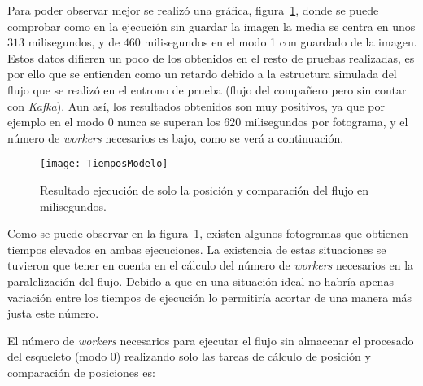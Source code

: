 {\begin{table}[h]
	\centering
	\caption{Tabla con los resultados de la ejecución solo de la posición y comparación del flujo en milisegundos.}
	\label{tab:res1}
\end{table}

Para poder observar mejor se realizó una gráfica, figura~\ref{fig:res1}, donde se puede comprobar como en la ejecución sin guardar la imagen la media se centra en unos $313$ milisegundos, y de $460$ milisegundos en el modo 1 con guardado de la imagen. Estos datos difieren un poco de los obtenidos en el resto de pruebas realizadas, es por ello que se entienden como un retardo debido a la estructura simulada del flujo que se realizó en el entrono de prueba (flujo del compañero pero sin contar con \textit{Kafka}). Aun así, los resultados obtenidos son muy positivos, ya que por ejemplo en el modo 0 nunca se superan los $620$ milisegundos por fotograma, y el número de \textit{workers} necesarios es bajo, como se verá a continuación.

\begin{figure}[h]
	\centering
	\texttt{[image: TiemposModelo]}
	\caption{Resultado ejecución de solo la posición y comparación del flujo en milisegundos.}
	\label{fig:res1}
\end{figure}

Como se puede observar en la figura~\ref{fig:res1}, existen algunos fotogramas que obtienen tiempos elevados en ambas ejecuciones. La existencia de estas situaciones se tuvieron que tener en cuenta en el cálculo del número de \textit{workers} necesarios en la paralelización del flujo. Debido a que en una situación ideal no habría apenas variación entre los tiempos de ejecución lo permitiría acortar de una manera más justa este número.

El número de \textit{workers} necesarios para ejecutar el flujo sin almacenar el procesado del esqueleto (modo 0) realizando solo las tareas de cálculo de posición y comparación de posiciones es:

}
